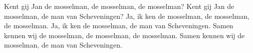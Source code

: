 \beginverse
Kent gij Jan de mosselman, de mosselman, de mosselman?
Kent gij Jan de mosselman, de man van Scheveningen?
\endverse
\beginverse*
Ja, ik ken de mosselman, de mosselman, de mosselman.
Ja, ik ken de mosselman, de man van Scheveningen.
\endverse
\beginverse*
Samen kennen wij de mosselman, de mosselman, de mosselman.
Samen kennen wij de mosselman, de man van Scheveningen.
\endverse
\endsong
